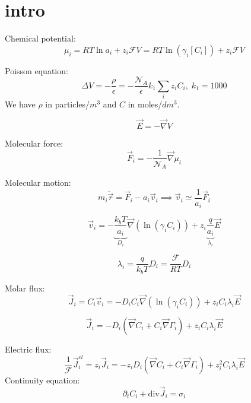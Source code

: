\documentclass[aps,12pt]{revtex4}
\begin{document}
\section{intro}
Chemical potential:
\begin{equation}
	\mu_i = RT \ln a_i + z_i \mathcal{F} V = RT \ln (\gamma_i[C_i]) + z_i \mathcal{F} V
\end{equation}

Poisson equation:
\begin{equation}
	\Delta V = - \dfrac{\rho}{\epsilon} = -\dfrac{\mathcal{N}_A}{\epsilon} k_1 \sum_i z_i C_i,\;k_1=1000
\end{equation}
We have $\rho$ in particles/$m^3$ and $C$ in moles/$dm^3$.

\begin{equation}
	\vec{E} = -\vec{\nabla} V
\end{equation}

Molecular force:	
\begin{equation}
	\vec{F}_i = - \frac{1}{\mathcal{N}_A} \vec{\nabla} \mu_i
\end{equation}

Molecular motion:
\begin{equation}
	m_i \ddot {\vec{r}} = \vec{F}_i - a_i \vec{v}_i \implies \vec{v}_i \simeq \dfrac{1}{a_i} \vec{F}_i
\end{equation}

\begin{equation}
	\vec{v}_i = -\underbrace{\dfrac{k_bT}{a_i}}_{D_i} \vec{\nabla}(\ln(\gamma_i C_i))  + z_i \underbrace{\dfrac{ q}{a_i}}_{\lambda_i} \vec{E}
\end{equation}

\begin{equation}
	\lambda_i = \frac{q}{k_bT} D_i = \dfrac{\mathcal{F}}{RT} D_i
\end{equation}

Molar flux:
\begin{equation}
\boxed{
	\vec{J}_i = C_i\vec{v}_i = -D_i C_i \vec{\nabla}(\ln(\gamma_i C_i)) + z_i C_i \lambda_i \vec{E}
	}
\end{equation}

\begin{equation}
	\vec{J}_i = - D_i \left( \vec{\nabla} C_i + C_i \vec{\nabla}\Gamma_i \right) + z_i C_i \lambda_i \vec{E}
\end{equation}

Electric flux:
\begin{equation}
	\dfrac{1}{\mathcal{F}} \vec{J}_i^{el} =  z_i \vec{J}_i = - z_i D_i \left( \vec{\nabla} C_i + C_i \vec{\nabla}\Gamma_i \right) + z_i^2 C_i \lambda_i \vec{E}
\end{equation}
Continuity equation:
\begin{equation}
	\partial_t C_i + \mathrm{div} \vec{J}_i = \sigma_i
\end{equation}
\end{document}

